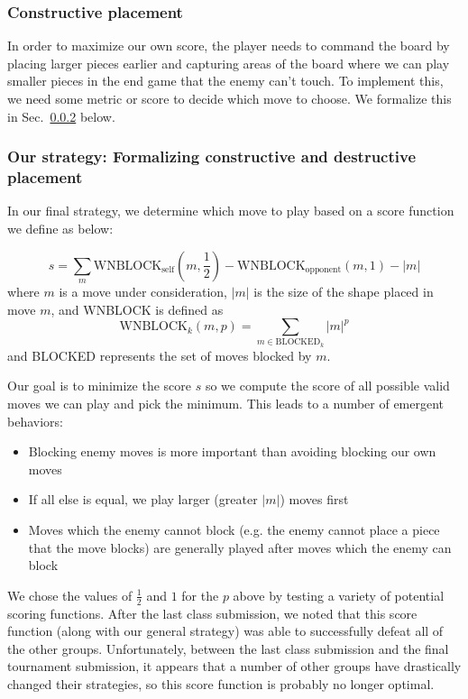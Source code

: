 \documentclass{scrartcl}
\begin{document}
\subsubsection{Constructive placement} %
In order to maximize our own score, the player needs to command the board by placing larger pieces earlier and capturing areas of the board where we can play smaller pieces in the end game that the enemy can't touch. To implement this, we need some metric or score to decide which move to choose. We formalize this in Sec.~\ref{sec:ourstrat} below. 

\subsubsection{Our strategy: Formalizing constructive and destructive placement}\label{sec:ourstrat} %
In our final strategy, we determine which move to play based on a score function we define as below:

\begin{equation}
s = \sum_{m} \text{WNBLOCK}_{\text{self}}\left(m, \frac{1}{2}\right) - \text{WNBLOCK}_{\text{opponent}}(m,1) - |m|
\end{equation}
where $m$ is a move under consideration, $|m|$ is the size of the shape placed in move $m$, and WNBLOCK is defined as
\begin{equation}
\text{WNBLOCK}_{k}(m,p) = \sum_{m \in \text{BLOCKED}_k} |m|^p
\end{equation}
and BLOCKED represents the set of moves blocked by $m$.

Our goal is to minimize the score $s$ so we compute the score of all possible valid moves we can play and pick the minimum. This leads to a number of emergent behaviors:
\begin{itemize}
\item Blocking enemy moves is more important than avoiding blocking our own moves
\item If all else is equal, we play larger (greater $|m|$) moves first
\item Moves which the enemy cannot block (e.g. the enemy cannot place a piece that the move blocks) are generally played after moves which the enemy can block
\end{itemize}

We chose the values of $\frac{1}{2}$ and $1$ for the $p$ above by testing a variety of potential scoring functions. After the last class submission, we noted that this score function (along with our general strategy) was able to successfully defeat all of the other groups. Unfortunately, between the last class submission and the final tournament submission, it appears that a number of other groups have drastically changed their strategies, so this score function is probably no longer optimal.
\end{document}
